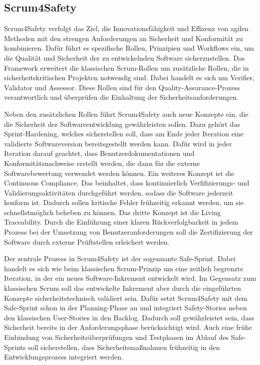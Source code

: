 \documentclass[acmtog]{acmart}
\begin{document}
\subsection{Scrum4Safety}

Scrum4Safety verfolgt das Ziel, die Innovationsfähigkeit und Effizenz von agilen Methoden mit den strengen Anforderungen an Sicherheit und Konformität zu kombinieren.
Dafür führt es spezifische Rollen, Prinzipien und Workflows ein, um die Qualität und Sicherheit der zu entwickelnden Software sicherzustellen. Das Framework
erweitert die klassischen Scrum-Rollen um zusätzliche Rollen, die in sicherheitskritischen Projekten notwendig sind. Dabei handelt es sich um Verifier, Validator und Assessor.
Diese Rollen sind für den Quality-Assurance-Prozess verantwortlich und überprüfen die Einhaltung der Sicherheitsanforderungen. 

Neben den zusätzlichen Rollen führt Scrum4Safety auch neue Konzepte ein, die die Sicherheit der Softwareentwicklung gewährleisten sollen. Dazu gehört das Sprint-Hardening,
welches sicherstellen soll, dass am Ende jeder Iteration eine validierte Softwareversion bereitsgestellt werden kann. Dafür wird in jeder Iteration darauf geachtet, 
dass Benutzerdokumentationen und Konformitätsnachweise erstellt werden, die dann für die externe Softwarebewertung verwendet werden können. 
Ein weiteres Konzept ist die Continuous Compliance. Das beinhaltet, dass kontinuierlich Verfifizierungs- und Validierungsaktivitäten durchgeführt werden, sodass die Software
jederzeit konform ist. Dadurch sollen kritische Fehler frühzeitig erkannt werden, um sie schnellstmöglich beheben zu können. Das dritte Konzept ist die Living Traceability.
Durch die Einführung einer klaren Rückverfolgbarkeit in jedem Prozess bei der Umsetzung von Benutzeranforderungen soll die Zertifizierung 
der Software durch externe Prüftstellen erleichert werden. \cite{andriadi_impact_2023}

Der zentrale Prozess in Scrum4Safety ist der sogennante Safe-Sprint. Dabei handelt es sich wie beim klassischen Scrum-Prinzip um eine zeitlich begrenzte Iteration, in 
der ein neues Software-Inkrement entwickelt wird. Im Gegensatz zum klassischen Scrum soll das entwickelte Inkrement aber durch die eingeführten Konzepte sicherheitstechnisch
validiert sein. Dafür setzt Scrum4Safety mit dem Safe-Sprint schon in der Planning-Phase an und integriert Safety-Stories neben den klassischen User-Stories in den Backlog.
Dadurch soll gewährleistet sein, dass Sicherheit bereits in der Anforderungsphase berücksichtigt wird. Auch eine frühe Einbindung von Sicherheitsüberprüfungen und Testphasen im Ablauf 
des Safe-Sprints soll sicherstellen, dass Sicherheitsmaßnahmen frühzeitig in den Entwicklungsprozess integriert werden. 
\end{document}
